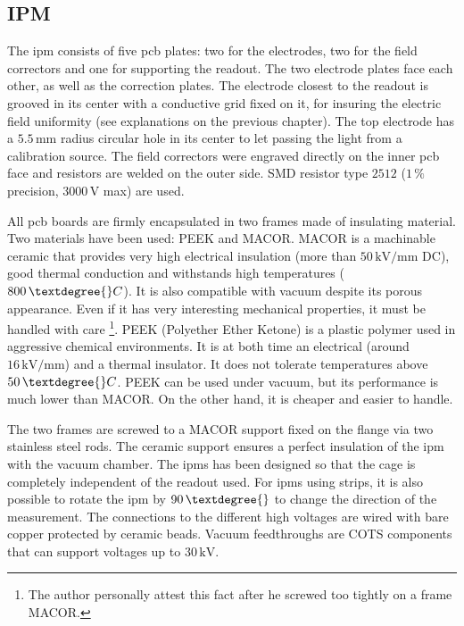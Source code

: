 \begin{refsection}
  \subsection{IPM}
  
  The \acrshort{ipm} consists of five \acrshort{pcb} plates: two for the electrodes, two for the field correctors and one for supporting the readout. The two electrode plates face each other, as well as the correction plates. The electrode closest to the readout is grooved in its center with a conductive grid fixed on it, for insuring the electric field uniformity (see explanations on the previous chapter). The top electrode has a $5.5\,\mathrm{mm}$ radius circular hole in its center to let passing the light from a calibration source. The field correctors were engraved directly on the inner \acrshort{pcb} face and resistors are welded on the outer side. SMD resistor type $2512$ ($1\,\mathrm{\%}$ precision, $3000\,\mathrm{V}$ max) are used.

  All \acrshort{pcb} boards are firmly encapsulated in two frames made of insulating material. Two materials have been used: PEEK and MACOR. MACOR is a machinable ceramic that provides very high electrical insulation (more than $50\,\mathrm{kV/mm}$ DC), good thermal conduction and withstands high temperatures ($800\,\textdegree{}C$). It is also compatible with vacuum despite its porous appearance. Even if it has very interesting mechanical properties, it must be handled with care \footnote{The author personally attest this fact after he screwed too tightly on a frame MACOR.}. PEEK (Polyether Ether Ketone) is a plastic polymer used in aggressive chemical environments. It is at both time an electrical (around $16\,\mathrm{kV/mm}$) and a thermal insulator. It does not tolerate temperatures above $50\,\textdegree{}C$. PEEK can be used under vacuum, but its performance is much lower than MACOR. On the other hand, it is cheaper and easier to handle.

  The two frames are screwed to a MACOR support fixed on the flange via two stainless steel rods. The ceramic support ensures a perfect insulation of the \acrshort{ipm} with the vacuum chamber. The \acrshort{ipm}s has been designed so that the cage is completely independent of the readout used. For \acrshort{ipm}s using strips, it is also possible to rotate the \acrshort{ipm} by $90\,\textdegree{}$ to change the direction of the measurement. The connections to the different high voltages are wired with bare copper protected by ceramic beads. Vacuum feedthroughs are COTS components that can support voltages up to $30\,\mathrm{kV}$.


\end{refsection}
